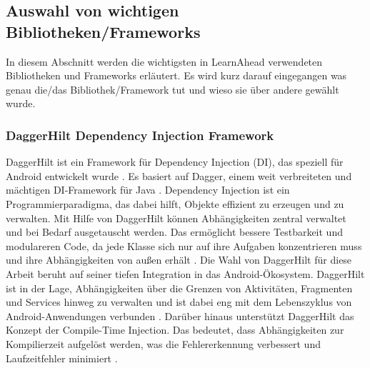 \subsection{Auswahl von wichtigen Bibliotheken/Frameworks} \label{Auswahl BibliothekenFrameworks}
In diesem Abschnitt werden die wichtigsten in LearnAhead verwendeten Bibliotheken und Frameworks erläutert. Es wird kurz darauf eingegangen was genau die/das Bibliothek/Framework tut und wieso sie über andere gewählt wurde.
\subsubsection{DaggerHilt Dependency Injection Framework}
DaggerHilt ist ein Framework für Dependency Injection (DI), das speziell für Android entwickelt wurde \cite{Dagger2021}. Es basiert auf Dagger, einem weit verbreiteten und mächtigen DI-Framework für Java \cite{AndroidDevelopers2021}. \newline
Dependency Injection ist ein Programmierparadigma, das dabei hilft, Objekte effizient zu erzeugen und zu verwalten. Mit Hilfe von DaggerHilt können Abhängigkeiten zentral verwaltet und bei Bedarf ausgetauscht werden. Das ermöglicht bessere Testbarkeit und modulareren Code, da jede Klasse sich nur auf ihre Aufgaben konzentrieren muss und ihre Abhängigkeiten von außen erhält \cite{Dagger2021}. \newline
Die Wahl von DaggerHilt für diese Arbeit beruht auf seiner tiefen Integration in das Android-Ökosystem. DaggerHilt ist in der Lage, Abhängigkeiten über die Grenzen von Aktivitäten, Fragmenten und Services hinweg zu verwalten und ist dabei eng mit dem Lebenszyklus von Android-Anwendungen verbunden \cite{AndroidDevelopers2021}. \newline
Darüber hinaus unterstützt DaggerHilt das Konzept der Compile-Time Injection. Das bedeutet, dass Abhängigkeiten zur Kompilierzeit aufgelöst werden, was die Fehlererkennung verbessert und Laufzeitfehler minimiert \cite{Dagger2021}. \newline
